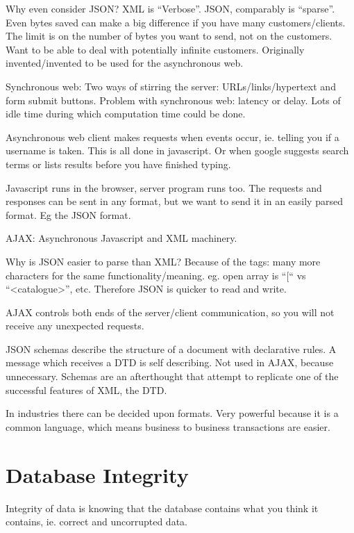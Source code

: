 \documentclass[11pt]{article}
\begin{document}
Why even consider JSON? XML is “Verbose”. JSON, comparably is “sparse”. Even bytes saved can make a big difference if you have many customers/clients. The limit is on the number of bytes you want to send, not on the customers. Want to be able to deal with potentially infinite customers. Originally invented/invented to be used for the asynchronous web.

Synchronous web:
Two ways of stirring the server: URLs/links/hypertext and form submit buttons.
Problem with synchronous web: latency or delay. Lots of idle time during which computation time could be done.

Asynchronous web
client makes requests when events occur, ie. telling you if a username is taken. This is all done in javascript. Or when google suggests search terms or lists results before you have finished typing.

Javascript runs in the browser, server program runs too. The requests and responses can be sent in any format, but we want to send it in an easily parsed format. Eg the JSON format.

AJAX: Asynchronous Javascript and XML machinery.

Why is JSON easier to parse than XML? Because of the tags: many more characters for the same functionality/meaning. eg. open array is “[“ vs “<catalogue>”, etc. Therefore JSON is quicker to read and write.

AJAX controls both ends of the server/client communication, so you will not receive any unexpected requests.

JSON schemas describe the structure of a document with declarative rules. A message which receives a DTD is self describing. Not used in AJAX, because unnecessary. Schemas are an afterthought that attempt to replicate one of the successful features of XML, the DTD.

In industries there can be decided upon formats. Very powerful because it is a common language, which means business to business transactions are easier.




\section{Database Integrity}

Integrity of data is knowing that the database contains what you think it contains, ie. correct and uncorrupted data.
\end{document}
